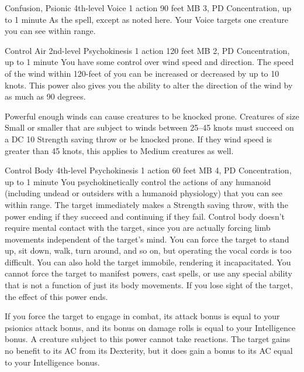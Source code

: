 \DndPowerHeader%
  {Confusion, Psionic}
  {4th-level Voice}
  {1 action}
  {90 feet}
  {MB 3, PD \lvlfour}
  {Concentration, up to 1 minute}
As the  spell, except as noted here.
Your Voice targets one creature you can see within range.

\DndPowerHeader%
  {Control Air}
  {2nd-level Psychokinesis}
  {1 action}
  {120 feet}
  {MB 2, PD \lvltwo}
  {Concentration, up to 1 minute}
  You have some control over wind speed and direction.
  The speed of the wind within 120-feet of you
  can be increased or decreased by up to 10 knots.
  This power also gives you the ability to alter the direction
  of the wind by as much as 90 degrees.
  
  Powerful enough winds can cause creatures to be knocked prone.
  Creatures of size Small or smaller that are subject
  to winds between 25--45 knots
  must succeed on a DC 10 Strength saving throw or be knocked prone.
  If they wind speed is greater than 45 knots,
  this applies to Medium creatures as well.

\DndPowerHeader%
  {Control Body}
  {4th-level Psychokinesis}
  {1 action}
  {60 feet}
  {MB 4, PD \lvlfour}
  {Concentration, up to 1 minute}
  You psychokinetically control the actions of any humanoid
  (including undead or outsiders with a humanoid physiology)
  that you can see within range.
  The target immediately makes a Strength saving throw,
  with the power ending if they succeed
  and continuing if they fail.
  Control body doesn't require mental contact with the target,
  since you are actually forcing limb movements independent
  of the target's mind.
  You can force the target to stand up,
  sit down,
  walk,
  turn around,
  and so on,
  but operating the vocal cords is too difficult.
  You can also hold the target immobile,
  rendering it incapacitated.
  You cannot force the target to manifest powers,
  cast spells,
  or use any special ability that is not a function
  of just its body movements.
  If you lose sight of the target,
  the effect of this power ends.

  If you force the target to engage in combat,
  its attack bonus is equal to your
  psionics attack bonus,
  and its bonus on damage rolls is equal
  to your Intelligence bonus.
  A creature subject to this power cannot take reactions.
  The target gains no benefit to its AC from its Dexterity,
  but it does gain a bonus to its AC
  equal to your Intelligence bonus.
  
